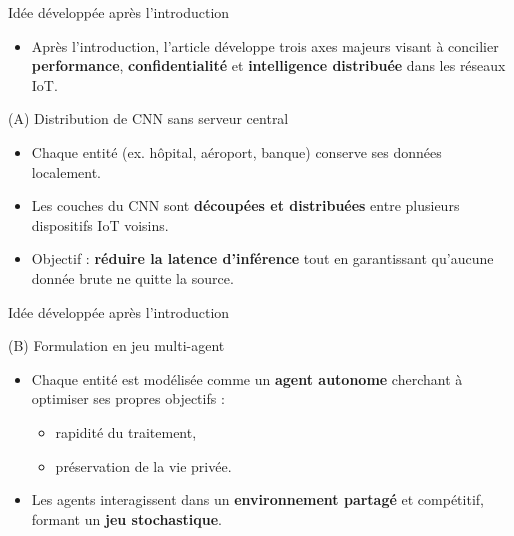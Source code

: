 \documentclass{beamer}
\begin{document}

 \begin{frame}{Idée développée après l’introduction}
\begin{itemize}
    \item Après l’introduction, l’article développe trois axes majeurs visant à concilier \textbf{performance}, \textbf{confidentialité} et \textbf{intelligence distribuée} dans les réseaux IoT.
\end{itemize}

\vspace{0.3cm}
\begin{block}{ (A) Distribution de CNN sans serveur central}
\begin{itemize}
    \item Chaque entité (ex. hôpital, aéroport, banque) conserve ses données localement.
    \item Les couches du CNN sont \textbf{découpées et distribuées} entre plusieurs dispositifs IoT voisins.
    \item Objectif : \textbf{réduire la latence d’inférence} tout en garantissant qu’aucune donnée brute ne quitte la source.
\end{itemize}
\end{block}
\end{frame}

\begin{frame}{Idée développée après l’introduction}

\begin{block}{ (B) Formulation en jeu multi-agent}
\begin{itemize}
    \item Chaque entité est modélisée comme un \textbf{agent autonome} cherchant à optimiser ses propres objectifs :
    \begin{itemize}
        \item rapidité du traitement,
        \item préservation de la vie privée.
    \end{itemize}
    \item Les agents interagissent dans un \textbf{environnement partagé} et compétitif, formant un \textbf{jeu stochastique}.
\end{itemize}
\end{block}
\end{frame}
\end{document}
